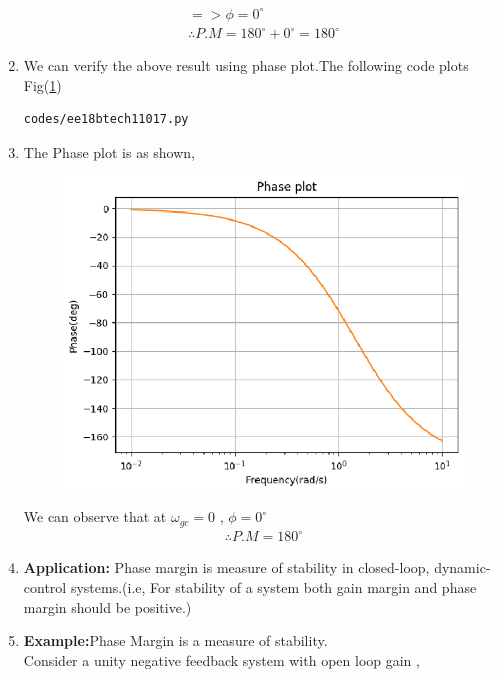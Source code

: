 \begin{enumerate}[label=\thesection.\arabic*.,ref=\thesection.\theenumi]
\begin{align}
=> \phi=0^{\circ}
\\
\therefore P.M=180^{\circ}+0^{\circ}=180^{\circ}    \label{eq:17}
\end{align}

\item
We can verify the above result using phase plot.The following code plots Fig(\ref{fig:ee18btech11017})
\begin{lstlisting}
codes/ee18btech11017.py
\end{lstlisting}
\item
The Phase plot is as shown,
\begin{figure}[!h]
  \includegraphics[width=\columnwidth]{./figures/ee18btech11017.eps}
  \caption{}
  \label{fig:ee18btech11017}
\end{figure}
We can observe that at $\omega_{gc}=0$ , $\phi=0^{\circ}$
\\
\begin{align}
\therefore P.M=180^{\circ} 
\end{align}
\item
\textbf{Application:} 
Phase margin is measure of stability in closed-loop, dynamic-control systems.(i.e, For stability of a system both gain margin and phase margin should be positive.)
\item
\textbf{Example:}Phase Margin is a measure of stability. \\
Consider a unity negative feedback system with open loop gain ,
\\
\begin{align}

\end{align}
\end{enumerate}
